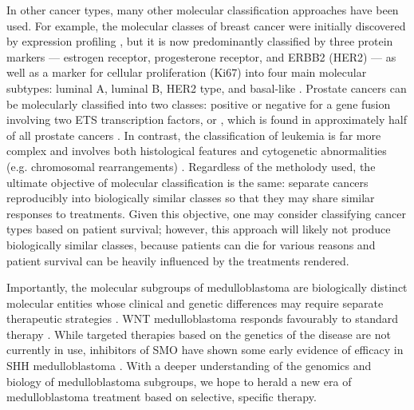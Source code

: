 In other cancer types, many other molecular classification approaches have been used. For example, the molecular classes of breast cancer were initially discovered by expression profiling , but it is now predominantly classified by three protein markers --- estrogen receptor, progesterone receptor, and ERBB2 (HER2) --- as well as a marker for cellular proliferation (Ki67) into four main molecular subtypes: luminal A, luminal B, HER2 type, and basal-like . Prostate cancers can be molecularly classified into two classes: positive or negative for a gene fusion involving two ETS transcription factors,  or , which is found in approximately half of all prostate cancers . In contrast, the classification of leukemia is far more complex and involves both histological features and cytogenetic abnormalities (e.g. chromosomal rearrangements) . Regardless of the metholody used, the ultimate objective of molecular classification is the same: separate cancers reproducibly into biologically similar classes so that they may share similar responses to treatments. Given this objective, one may consider classifying cancer types based on patient survival; however, this approach will likely not produce biologically similar classes, because patients can die for various reasons and patient survival can be heavily influenced by the treatments rendered.

Importantly, the molecular subgroups of medulloblastoma are biologically distinct molecular entities whose clinical and genetic differences may require separate therapeutic strategies . WNT medulloblastoma responds favourably to standard therapy . While targeted therapies based on the genetics of the disease are not currently in use, inhibitors of SMO have shown some early evidence of efficacy in SHH medulloblastoma . With a deeper understanding of the genomics and biology of medulloblastoma subgroups, we hope to herald a new era of medulloblastoma treatment based on selective, specific therapy.





